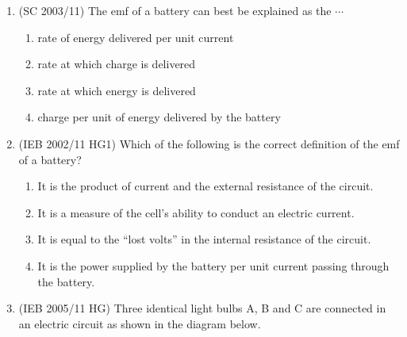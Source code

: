 \begin{enumerate}[noitemsep, label=\textbf{\arabic*}. ]
\begin{figure}[H]
\begin{center}
      \vspace{2pt}
    \vspace{.1in}
    
    \end{center}

 \end{figure}   

    \addtocounter{footnote}{-0}
             
\label{m38776*uid90}\item (SC 2003/11) The emf of a battery can best be explained as the \begin{math}\cdots \end{math}\label{m38776*id68404}\begin{enumerate}[noitemsep, label=\textbf{\alph*}. ] 
            \label{m38776*uid91}\item rate of energy delivered per unit current
\label{m38776*uid92}\item rate at which charge is delivered
\label{m38776*uid93}\item rate at which energy is delivered
\label{m38776*uid94}\item charge per unit of energy delivered by the battery
\end{enumerate}
                  \label{m38776*uid95}\item (IEB 2002/11 HG1) Which of the following is the correct definition of the emf of a battery?
\label{m38776*id68470}\begin{enumerate}[noitemsep, label=\textbf{\alph*}. ] 
            \label{m38776*uid96}\item It is the product of current and the external resistance of the circuit.
\label{m38776*uid97}\item It is a measure of the cell's ability to conduct an electric current.
\label{m38776*uid98}\item It is equal to the ``lost volts'' in the internal resistance of the circuit.
\label{m38776*uid99}\item It is the power supplied by the battery per unit current passing through the battery.
\end{enumerate}
                  \label{m38776*uid100}\item (IEB 2005/11 HG) Three identical light bulbs A, B and C are connected in an electric circuit as shown in the diagram below.

    \setcounter{subfigure}{0}



\end{enumerate}
